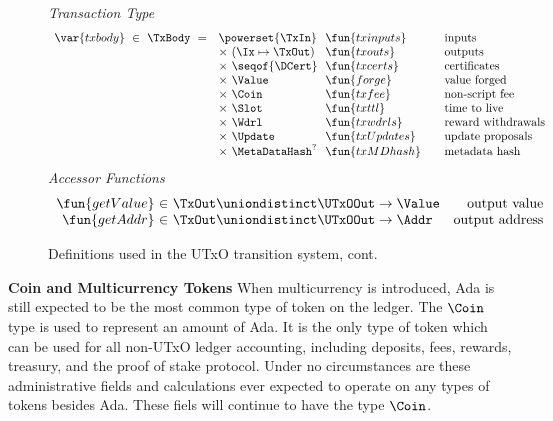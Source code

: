 \begin{figure*}[htb]
  \emph{Transaction Type}
  \begin{equation*}
    \begin{array}{r@{~~}l@{~~}l@{\qquad}l}
      \var{txbody} ~\in~ \TxBody ~=~
      & \powerset{\TxIn} & \fun{txinputs}& \text{inputs}\\
      &\times ~(\Ix \mapsto \TxOut) & \fun{txouts}& \text{outputs}\\
      & \times~ \seqof{\DCert} & \fun{txcerts}& \text{certificates}\\
       & \times ~\Value  & \fun{forge} &\text{value forged}\\
       & \times ~\Coin & \fun{txfee} &\text{non-script fee}\\
       & \times ~\Slot & \fun{txttl} & \text{time to live}\\
       & \times~ \Wdrl  & \fun{txwdrls} &\text{reward withdrawals}\\
       & \times ~\Update  & \fun{txUpdates} & \text{update proposals}\\
       & \times ~\MetaDataHash^? & \fun{txMDhash} & \text{metadata hash}\\
    \end{array}
  \end{equation*}
  \emph{Accessor Functions}
  \begin{equation*}
    \begin{array}{r@{~\in~}lr}
      \fun{getValue} & \TxOut \uniondistinct \UTxOOut \to \Value & \text{output value} \\
      \fun{getAddr} & \TxOut \uniondistinct \UTxOOut \to \Addr & \text{output address} \\
    \end{array}
  \end{equation*}
  \caption{Definitions used in the UTxO transition system, cont.}
  \label{fig:defs:utxo-shelley-2}
\end{figure*}

\textbf{Coin and Multicurrency Tokens}
When multicurrency is introduced, Ada is still expected to be
the most common type of token on the ledger.
The $\Coin$ type is used to represent an amount of Ada.
It is the only
type of token which can be used for all non-UTxO ledger accounting, including deposits,
fees, rewards, treasury, and the proof of stake protocol. Under no circumstances
are these administrative fields and calculations ever expected to operate on
any types of tokens besides Ada. These fiels will continue to have the type $\Coin$.

